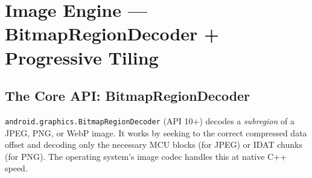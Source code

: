 \documentclass[12pt,a4paper]{report}
\newcommand{\PB}{\newpage}
\begin{document}
\PB

\chapter{Image Engine — BitmapRegionDecoder + Progressive Tiling}

\section{The Core API: BitmapRegionDecoder}

\texttt{android.graphics.BitmapRegionDecoder} (API 10+) decodes a
\emph{subregion} of a JPEG, PNG, or WebP image. It works by seeking to the
correct compressed data offset and decoding only the necessary MCU blocks
(for JPEG) or IDAT chunks (for PNG). The operating system's image codec
handles this at native C++ speed.
\end{document}
